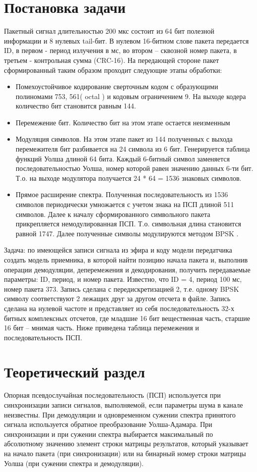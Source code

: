 \documentclass[a4paper]{article}
\begin{document}
\vfill %

\section{Постановка задачи}
	Пакетный сигнал длительностью 200 мкс состоит из 64 бит полезной информации и 8 нулевых tail-бит. В нулевом 16-битном слове пакета передается ID, в первом - период излучения в мс, во втором – сквозной номер пакета, в третьем - контрольная сумма (CRC-16). На передающей стороне пакет сформированный таким образом проходит следующие этапы
	обработки:
	\begin{itemize}
		\item  Помехоустойчивое кодирование сверточным кодом с образующими полиномами 753, 561( octal ) и кодовым ограничением 9. На выходе кодера количество бит становится равным 144.
		\item Перемежение бит. Количество бит на этом этапе остается неизменным
		\item Модуляция символов. На этом этапе пакет из 144 полученных с выхода перемежителя бит разбивается на 24 символа из 6 бит. Генерируется таблица функций Уолша длиной 64 бита. Каждый 6-битный символ заменяется последовательностью Уолша, номер которой равен значению данных 6-ти бит. Т.о. на выходе модулятора получается 24 * 64 = 1536 знаковых символов.
		\item Прямое расширение спектра. Полученная последовательность из 1536 символов периодически умножается с учетом знака на ПСП длиной 511 символов. Далее к началу сформированного символьного пакета прикрепляется немодулированная ПСП. Т.о. символьная длина становится равной 1747. Далее полученные символы модулируются методом BPSK .
	\end{itemize}
	Задача: по имеющейся записи сигнала из эфира и коду модели передатчика создать модель приемника, в которой найти позицию начала пакета и, выполнив операции демодуляции, деперемежения и декодирования, получить передаваемые параметры: ID, период, и номер пакета. Известно, что ID = 4, период 100 мс, номер пакета 373. Запись сделана с передискретизацией 2, т.е. одному BPSK символу соответствуют 2 лежащих друг за другом отсчета в файле. Запись сделана на нулевой частоте и представляет из себя последовательность 32-х битных комплексных	отсчетов, где младшие 16 бит вещественная часть, старшие 16 бит – мнимая часть. Ниже приведена таблица перемежения и последовательность ПСП.

\section{Теоретический раздел}
Опорная псевдослучайная последовательность (ПСП) используется при синхронизации записи сигналов, выполняемой, если параметры шума в канале неизвестны. При демодуляции и одновременном сужении спектра принятого сигнала используется обратное преобразование Уолша-Адамара. При синхронизации и при сужении спектра выбирается максимальный по абсолютному значению элемент строки матрицы результатов, который указывает на начало пакета (при синхронизации) или на бинарный номер строки матрицы Уолша (при сужении спектра и демодуляции).
\end{document}
